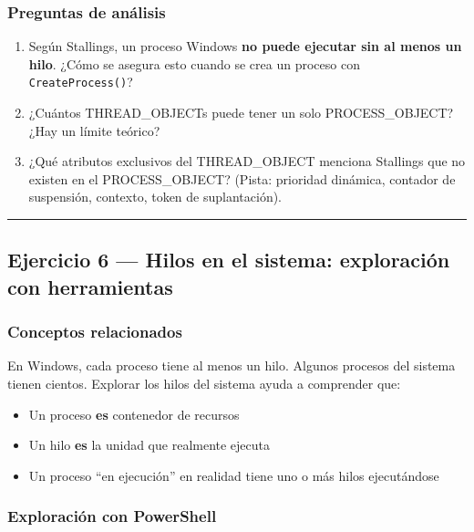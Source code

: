 \documentclass[
  spanish,
]{article}
\providecommand{\tightlist}{%
  \setlength{\itemsep}{0pt}\setlength{\parskip}{0pt}}
\begin{document}
\subsubsection{Preguntas de análisis}\label{preguntas-de-anuxe1lisis-5}

\begin{enumerate}
\def\labelenumi{\arabic{enumi}.}
\tightlist
\item
  Según Stallings, un proceso Windows \textbf{no puede ejecutar sin al
  menos un hilo}. ¿Cómo se asegura esto cuando se crea un proceso con
  \texttt{CreateProcess()}?
\item
  ¿Cuántos THREAD\_OBJECTs puede tener un solo PROCESS\_OBJECT? ¿Hay un
  límite teórico?
\item
  ¿Qué atributos exclusivos del THREAD\_OBJECT menciona Stallings que no
  existen en el PROCESS\_OBJECT? (Pista: prioridad dinámica, contador de
  suspensión, contexto, token de suplantación).
\end{enumerate}

\begin{center}\rule{0.5\linewidth}{0.5pt}\end{center}

\subsection{Ejercicio 6 --- Hilos en el sistema: exploración con
herramientas}\label{ejercicio-6-hilos-en-el-sistema-exploraciuxf3n-con-herramientas}

\subsubsection{Conceptos relacionados}\label{conceptos-relacionados-3}

En Windows, cada proceso tiene al menos un hilo. Algunos procesos del
sistema tienen cientos. Explorar los hilos del sistema ayuda a
comprender que:

\begin{itemize}
\tightlist
\item
  Un proceso \textbf{es} contenedor de recursos
\item
  Un hilo \textbf{es} la unidad que realmente ejecuta
\item
  Un proceso ``en ejecución'' en realidad tiene uno o más hilos
  ejecutándose
\end{itemize}

\subsubsection{Exploración con
PowerShell}\label{exploraciuxf3n-con-powershell}
\end{document}
